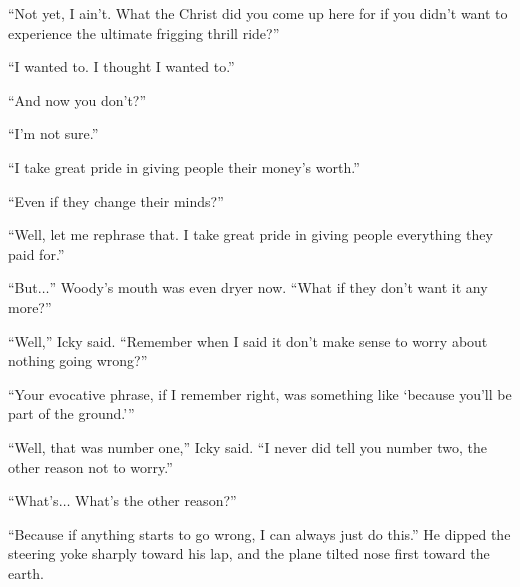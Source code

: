 ``Not yet, I ain't. What the Christ did you come up here for if you didn't want to experience the ultimate frigging thrill ride?''

``I wanted to. I thought I wanted to.''

``And now you don't?''

``I'm not sure.''

``I take great pride in giving people their money's worth.''

``Even if they change their minds?''

``Well, let me rephrase that. I take great pride in giving people everything they paid for.''

``But$\ldots$'' Woody's mouth was even dryer now. ``What if they don't want it any more?''

``Well,'' Icky said. ``Remember when I said it don't make sense to worry about nothing going wrong?''

``Your evocative phrase, if I remember right, was something like `because you'll be part of the ground.'\thinspace''

``Well, that was number one,'' Icky said. ``I never did tell you number two, the other reason not to worry.''

``What's$\ldots$ What's the other reason?''

``Because if anything starts to go wrong, I can always just do this.'' He dipped the steering yoke sharply toward his lap, and the plane tilted nose first toward the earth.
